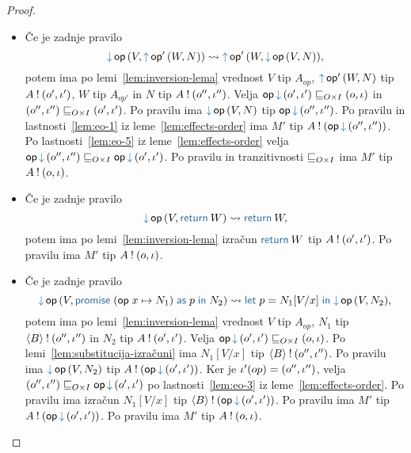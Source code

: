 \begin{proof}
\begin{itemize}
		\item Če je zadnje pravilo $$\tmopin{op}{V}{\tmopout{op'}{W}{N}} \reduces \tmopout{op'}{W}{\tmopin{op}{V}{N}},$$ potem ima po lemi~\ref{lem:inversion-lema} vrednost $V$ tip $A_{op}$, $\tmopout{op'}{W}{N}$ tip $A \mathbin{!} (o', \iota')$, $W$ tip $A_{op'}$ in $N$ tip $A \mathbin{!} (o'', \iota'')$.
		Velja $\opincomp{op}{(\o', \i')} \order{O \times I} (\o, \i)$ in $(o'', \iota'') \sqsubseteq_{O \times I} (o', \iota')$.
		Po pravilu  ima $\tmopin{op}{V}{N}$ tip $\opincomp{op}{(\o'', \i'')}$. 
		Po pravilu  in lastnosti~\ref{lem:eo-1} iz leme~\ref{lem:effects-order} ima $M'$ tip $\tycomp{A}{\opincomp{op}{(\o'', \i'')}}$.
		Po lastnosti~\ref{lem:eo-5} iz leme~\ref{lem:effects-order} velja $\opincomp{op}{(\o'', \i'')} \order{O \times I} \opincomp{op}{(\o', \i')}$.
		Po pravilu  in tranzitivnosti $\sqsubseteq_{O \times I}$ ima $M'$ tip $A \mathbin{!} (o, \iota)$.
		
		\item Če je zadnje pravilo $$\tmopin{op}{V}{\tmreturn W} \reduces \tmreturn W,$$ potem ima po lemi~\ref{lem:inversion-lema} izračun $\tmreturn{W}$ tip $A \mathbin{!} (o', \iota')$.
		Po pravilu  ima $M'$ tip $A \mathbin{!} (o, \iota)$.
		
		\item Če je zadnje pravilo $$\tmopin{op}{V}{\tmwith{op}{x}{N_1}{p}{N_2}} \reduces \tmlet{p}{N_1[V/x]}{\tmopin{op}{V}{N_2}},$$ potem ima po lemi~\ref{lem:inversion-lema} vrednost $V$ tip $A_{op}$, $N_1$ tip $\langle B \rangle \mathbin{!} (o'', \iota'')$ in $N_2$ tip $A \mathbin{!} (o', \iota')$.
		Velja $\opincomp{op}{(\o', \i')} \order{O \times I} (\o, \i)$.
		Po lemi~\ref{lem:substitucija-izračuni} ima $N_1[V/x]$ tip $\langle B \rangle \mathbin{!} (o'', \iota'')$.
		Po pravilu  ima $\tmopin{op}{V}{N_2}$ tip $\tycomp{A}{\opincomp{op}{(\o', \i')}}$.
		Ker je $\iota'(op) = (o'', \iota'')$, velja $(\o'', \i'') \order{O \times I} \opincomp{op}{(\o', \i')}$ po lastnosti~\ref{lem:eo-3} iz leme~\ref{lem:effects-order}.
		Po pravilu  ima izračun $N_1[V/x]$ tip $\tycomp{\typromise{B}}{\opincomp{op}{(\o', \i')}}$.
		Po pravilu  ima $M'$ tip $\tycomp{A}{\opincomp{op}{(\o', \i')}}$.
		Po pravilu  ima $M'$ tip $A \mathbin{!} (o, \iota)$.
		

\end{itemize}
\end{proof}
